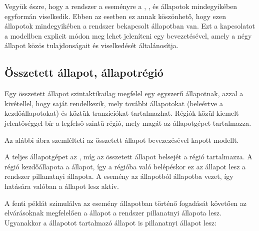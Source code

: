 Vegyük észre, hogy a rendszer a  eseményre a , ,  és  állapotok mindegyikében egyformán viselkedik. Ebben az esetben ez annak köszönhető, hogy ezen állapotok mindegyikében a rendszer bekapcsolt állapotban van. Ezt a kapcsolatot a modellben explicit módon meg lehet jeleníteni egy  bevezetésével, amely a négy állapot közös tulajdonságait és viselkedését általánosítja.

\subsection{Összetett állapot, állapotrégió}

Egy összetett állapot szintaktikailag megfelel egy egyszerű állapotnak, azzal a kivétellel, hogy saját  rendelkezik, mely további állapotokat (beleértve a kezdőállapotokat) és köztük tranzíciókat tartalmazhat. Régiók közül kiemelt jelentőséggel bír a legfelső szintű régió, mely magát az állapotgépet tartalmazza.

\begin{megjegyzes}
	Az alábbi ábra szemlélteti az  összetett állapot bevezezésével kapott modellt.


	A teljes állapotgépet az , míg az összetett állapot belsejét a  régió tartalmazza. A  régió kezdőállapota a  állapot, így a régióba való belépéskor ez az állapot lesz a rendszer pillanatnyi állapota. A  esemény az  állapotból  állapotba vezet, így hatására valóban a  állapot lesz aktív.
\end{megjegyzes}
 	
\begin{megjegyzes}
	A fenti példát szimulálva az  esemény  állapotban történő fogadását követően az elvárásoknak megfelelően a  állapot a rendszer pillanatnyi állapota lesz. Ugyanakkor a  állapotot tartalmazó  állapot is pillanatnyi állapot lesz:

\end{megjegyzes}


